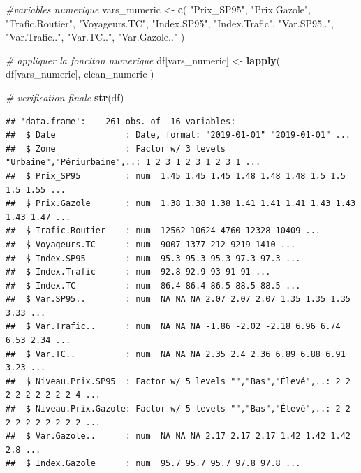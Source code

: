 \documentclass[
]{article}
\newenvironment{Shaded}{\begin{snugshade}}{\end{snugshade}}
\newcommand{\CommentTok}[1]{\textcolor[rgb]{0.56,0.35,0.01}{\textit{#1}}}
\newcommand{\FunctionTok}[1]{\textcolor[rgb]{0.13,0.29,0.53}{\textbf{#1}}}
\newcommand{\NormalTok}[1]{#1}
\newcommand{\OtherTok}[1]{\textcolor[rgb]{0.56,0.35,0.01}{#1}}
\newcommand{\StringTok}[1]{\textcolor[rgb]{0.31,0.60,0.02}{#1}}
\begin{document}
\begin{Shaded}
\begin{Highlighting}[]
\CommentTok{\#variables numerique}
\NormalTok{vars\_numeric }\OtherTok{\textless{}{-}} \FunctionTok{c}\NormalTok{(}
  \StringTok{"Prix\_SP95"}\NormalTok{,}
  \StringTok{"Prix.Gazole"}\NormalTok{,}
  \StringTok{"Trafic.Routier"}\NormalTok{,}
  \StringTok{"Voyageurs.TC"}\NormalTok{,}
  \StringTok{"Index.SP95"}\NormalTok{,}
  \StringTok{"Index.Trafic"}\NormalTok{,}
  \StringTok{"Var.SP95.."}\NormalTok{,}
  \StringTok{"Var.Trafic.."}\NormalTok{,}
  \StringTok{"Var.TC.."}\NormalTok{,}
  \StringTok{"Var.Gazole.."}
\NormalTok{)}
\end{Highlighting}
\end{Shaded}

\begin{Shaded}
\begin{Highlighting}[]
\CommentTok{\# appliquer la fonciton numerique}
\NormalTok{df[vars\_numeric] }\OtherTok{\textless{}{-}} \FunctionTok{lapply}\NormalTok{(}
\NormalTok{  df[vars\_numeric],}
\NormalTok{  clean\_numeric}
\NormalTok{)}
\end{Highlighting}
\end{Shaded}

\begin{Shaded}
\begin{Highlighting}[]
\CommentTok{\# verification finale}
\FunctionTok{str}\NormalTok{(df)}
\end{Highlighting}
\end{Shaded}

\begin{verbatim}
## 'data.frame':    261 obs. of  16 variables:
##  $ Date              : Date, format: "2019-01-01" "2019-01-01" ...
##  $ Zone              : Factor w/ 3 levels "Urbaine","Périurbaine",..: 1 2 3 1 2 3 1 2 3 1 ...
##  $ Prix_SP95         : num  1.45 1.45 1.45 1.48 1.48 1.48 1.5 1.5 1.5 1.55 ...
##  $ Prix.Gazole       : num  1.38 1.38 1.38 1.41 1.41 1.41 1.43 1.43 1.43 1.47 ...
##  $ Trafic.Routier    : num  12562 10624 4760 12328 10409 ...
##  $ Voyageurs.TC      : num  9007 1377 212 9219 1410 ...
##  $ Index.SP95        : num  95.3 95.3 95.3 97.3 97.3 ...
##  $ Index.Trafic      : num  92.8 92.9 93 91 91 ...
##  $ Index.TC          : num  86.4 86.4 86.5 88.5 88.5 ...
##  $ Var.SP95..        : num  NA NA NA 2.07 2.07 2.07 1.35 1.35 1.35 3.33 ...
##  $ Var.Trafic..      : num  NA NA NA -1.86 -2.02 -2.18 6.96 6.74 6.53 2.34 ...
##  $ Var.TC..          : num  NA NA NA 2.35 2.4 2.36 6.89 6.88 6.91 3.23 ...
##  $ Niveau.Prix.SP95  : Factor w/ 5 levels "","Bas","Élevé",..: 2 2 2 2 2 2 2 2 2 4 ...
##  $ Niveau.Prix.Gazole: Factor w/ 5 levels "","Bas","Élevé",..: 2 2 2 2 2 2 2 2 2 2 ...
##  $ Var.Gazole..      : num  NA NA NA 2.17 2.17 2.17 1.42 1.42 1.42 2.8 ...
##  $ Index.Gazole      : num  95.7 95.7 95.7 97.8 97.8 ...
\end{verbatim}
\end{document}
